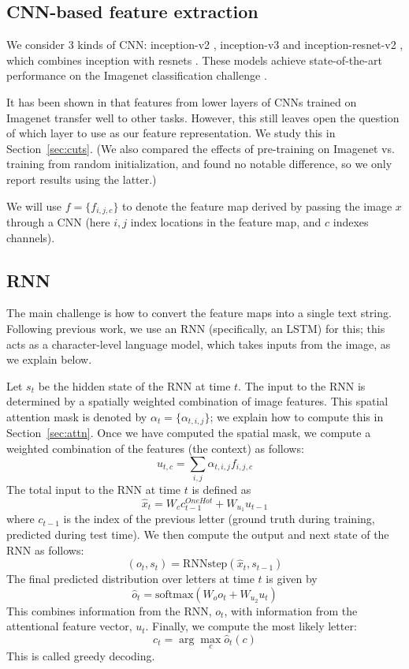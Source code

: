 \documentclass[conference]{IEEEtran}
\newcommand{\be}{\begin{equation}}
\newcommand{\ee}{\end{equation}}
\begin{document}
\subsection{CNN-based feature extraction}

We consider 3 kinds of CNN: inception-v2 \cite{szegedy2015rethinking},
inception-v3 \cite{szegedy2016inception} and inception-resnet-v2
\cite{szegedy2016inception}, which combines inception
with resnets \cite{he2015deep}. These models achieve
state-of-the-art performance on the Imagenet classification challenge
\cite{ILSVRCarxiv14, canziani2016analysis}. 

It has been shown in \cite{yosinski2014transferable} that features
from lower layers of CNNs trained on Imagenet transfer well to other
tasks.
However, this still leaves open the question of which layer to use as
our feature representation. We study this in
Section~\ref{sec:cuts}.
(We also compared the effects of pre-training on Imagenet
vs. training from random initialization, and found no notable difference,
so we only report results using the latter.)


We will use $f= \{f_{i,j,c}\}$ to denote the feature map derived by
passing the image $x$ through a CNN (here $i,j$ index locations in the
feature map, and $c$ indexes channels). 


\subsection{RNN}

The main challenge is how to convert the feature maps into a single
text string. Following previous work, we use an RNN
(specifically, an LSTM\cite{hochreiter1997long})
for this; this
acts as a character-level language model, which takes inputs from 
the image, as we explain below.


Let $s_t$ be the hidden state of the RNN at time $t$.
The input to the RNN is determined by a spatially weighted combination of image features.
This spatial attention mask is denoted by
$\alpha_t=\{\alpha_{t,i,j}\}$; we explain how to compute this in Section~\ref{sec:attn}.
Once we have computed the spatial mask, we
compute a weighted combination of the features (the context) as
follows:  
\be
u_{t,c} = \sum_{i,j} \alpha_{t,i,j} f_{i,j,c}
\ee
The total input to the RNN at time $t$ is defined as
\be
\hat{x}_{t} = W_c c_{t-1}^{OneHot} + W_{u_1} u_{t-1}
\ee
where $c_{t-1}$ is the index of the previous letter
(ground truth during training, predicted during test time).
We then compute the output and next state of the RNN as follows:
\be  
(o_t, s_t) = \mathrm{RNNstep}(\hat{x}_{t}, s_{t-1})
\ee
The final predicted distribution over letters at time $t$ is given by
\be
\hat{o}_t = \mathrm{softmax}(W_o o_t + W_{u_2} u_t)
\ee
This combines information from the RNN, $o_t$, with information from
the attentional feature vector, $u_t$.
Finally, we compute the most likely letter:
\be
c_t = \arg \max_c \hat{o}_t(c)
\ee
This is called greedy decoding.
\end{document}

